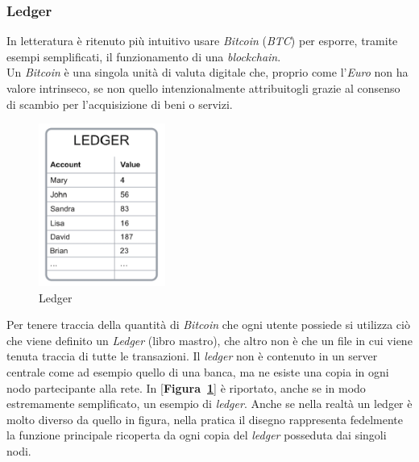 \documentclass[11pt]{thesistemp}
\begin{document}
\subsubsection{Ledger}
In letteratura è ritenuto più intuitivo usare \textit{Bitcoin} (\textit{BTC}) per esporre, tramite esempi semplificati, il funzionamento di una \textit{blockchain}.\\
Un \textit{Bitcoin} è una singola unità di valuta digitale che, proprio come l'\textit{Euro} non ha valore intrinseco, se non quello intenzionalmente attribuitogli grazie al consenso di scambio per l'acquisizione di beni o servizi.\\
\begin{figure}
	\vspace{-31pt}
	\begin{center}
    	\includegraphics[width=0.37\textwidth]{ledger.png}
  	\end{center}
  	\vspace{-10pt}
  	\caption{Ledger}
  	\label{fig:ledger}
  	\vspace{-30pt}
\end{figure}
Per tenere traccia della quantità di \textit{Bitcoin} che ogni utente possiede si utilizza ciò che viene definito un \textit{Ledger} (libro mastro), che altro non è che un file in cui viene tenuta traccia di tutte le transazioni.
Il \textit{ledger} non è contenuto in un server centrale come ad esempio quello di una banca, ma ne esiste una copia in ogni nodo partecipante alla rete. In [\textbf{Figura~\ref{fig:ledger}}] è riportato, anche se in modo estremamente semplificato, un esempio di \textit{ledger}. 
Anche se nella realtà un ledger è molto diverso da quello in figura, nella pratica il disegno rappresenta fedelmente la funzione principale ricoperta da ogni copia del \textit{ledger} posseduta dai singoli nodi.
\end{document}
